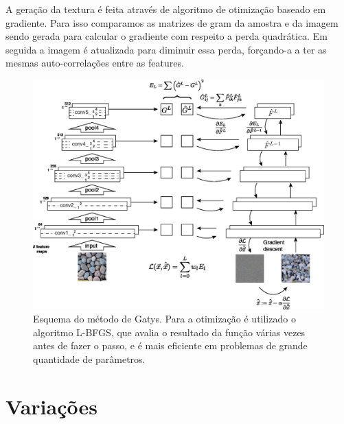 A geração da textura é feita através de algoritmo
de otimização baseado em gradiente. Para isso
comparamos as matrizes de gram da amostra e da
imagem sendo gerada para calcular o gradiente
com respeito a perda quadrática. Em seguida
a imagem é atualizada para diminuir essa perda,
forçando-a a ter as mesmas auto-correlações entre
as features.

\begin{figure}[!ht]
	\centering
	\includegraphics[width=\linewidth*2/3]{files/assets/articles/gatys2.png}
	\caption{Esquema do método de Gatys. Para a otimização
		é utilizado o algoritmo L-BFGS, 
		que avalia o resultado da função
		várias vezes antes de fazer o passo,
		e é mais eficiente em problemas de grande quantidade
		de parâmetros.}
	\label{img:preview}
\end{figure}


 






\iftrue
\chapter{Variações}

